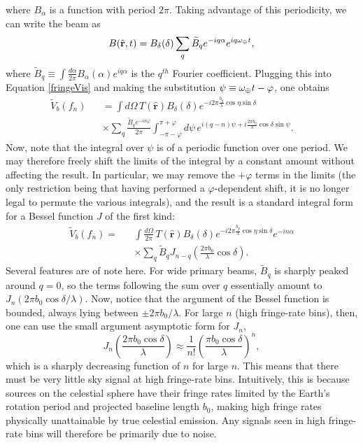 \documentclass[twocolumn,apj,numberedappendix]{emulateapj}
\newcommand{\rhat}{\hat{\mathbf{r}}}
\begin{document}
where $B_\alpha$ is a function with period $2\pi$.  Taking advantage of this periodicity, we can write the beam as
\begin{equation}
B(\rhat, t) = B_\delta (\delta) \sum_q \widetilde{B}_q e^{-iq \alpha} e^{i q \omega_\Earth t},
\end{equation}
where $\widetilde{B}_q \equiv \int \frac{d\alpha}{2\pi} B_\alpha(\alpha)
e^{i q\alpha}$ is the $q^{th}$ Fourier coefficient.  Plugging this into
Equation \eqref{fringeVis} and making the substitution $\psi \equiv
\omega_\oplus t - \varphi$, one obtains
\begin{eqnarray}
\widetilde{V}_b (f_n) &&= \int d\Omega \, T(\rhat) B_\delta (\delta) e^{-i 2 \pi  \frac{b_y}{\lambda} \cos \eta \sin \delta} \nonumber \\
&& \times \sum_q \frac{\widetilde{B}_q e^{-i n \varphi}}{2 \pi} \int_{-\pi -\varphi}^{\pi+\varphi} d\psi \, e^{i (q-n) \psi +i \frac{2 \pi b_0}{\lambda} \cos \delta \sin \psi}. \qquad
\end{eqnarray}
Now, note that the integral over $\psi$ is of a periodic function over one
period.  We may therefore freely shift the limits of the integral by a constant
amount without affecting the result.  In particular, we may remove the
$+\varphi$ terms in the limits (the only restriction being that having performed a $\varphi$-dependent shift, it is no longer legal to permute the various integrals), and
the result is a standard integral form for a Bessel function $J$ of the first
kind:
\begin{eqnarray}
\label{fringeBessel}
\widetilde{V}_b (f_n) =&& \int \frac{d\Omega}{2 \pi}\, T(\rhat) B_\delta (\delta) e^{-i 2 \pi  \frac{b_y}{\lambda} \cos \eta \sin \delta}
e^{-i n \alpha} \nonumber \\ 
&& \times \sum_q \widetilde{B}_q  J_{n-q} \left( \frac{2 \pi b_0}{\lambda} \cos \delta \right).
\end{eqnarray}
Several features are of note here.  For wide primary beams, $\widetilde{B}_q$
is sharply peaked around $q=0$, so the terms following the sum over $q$
essentially amount to $J_n ( 2 \pi b_0 \cos \delta / \lambda )$.  Now, notice
that the argument of the Bessel function is bounded, always lying between $\pm
2\pi b_0/ \lambda$.  For large $n$ (high fringe-rate bins), then, one can use
the small argument asymptotic form for $J_n$,\begin{equation}
J_n \left( \frac{2 \pi b_0 \cos \delta}{ \lambda} \right) \approx \frac{1}{n!} \left( \frac{ \pi b_0 \cos \delta}{ \lambda} \right)^n,
\end{equation}
which is a sharply decreasing function of $n$ for large $n$.  This means that
there must be very little sky signal at high fringe-rate bins.  Intuitively,
this is because sources on the celestial sphere have their fringe rates limited
by the Earth's rotation period and projected baseline length $b_0$, making high
fringe rates physically unattainable by true celestial emission.  Any signals
seen in high fringe-rate bins will therefore be primarily due to noise.
\end{document}

